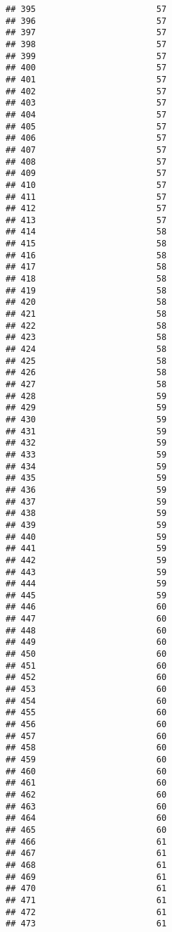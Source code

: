 \documentclass[
]{article}
\begin{document}
\begin{verbatim}
## 395                        57
## 396                        57
## 397                        57
## 398                        57
## 399                        57
## 400                        57
## 401                        57
## 402                        57
## 403                        57
## 404                        57
## 405                        57
## 406                        57
## 407                        57
## 408                        57
## 409                        57
## 410                        57
## 411                        57
## 412                        57
## 413                        57
## 414                        58
## 415                        58
## 416                        58
## 417                        58
## 418                        58
## 419                        58
## 420                        58
## 421                        58
## 422                        58
## 423                        58
## 424                        58
## 425                        58
## 426                        58
## 427                        58
## 428                        59
## 429                        59
## 430                        59
## 431                        59
## 432                        59
## 433                        59
## 434                        59
## 435                        59
## 436                        59
## 437                        59
## 438                        59
## 439                        59
## 440                        59
## 441                        59
## 442                        59
## 443                        59
## 444                        59
## 445                        59
## 446                        60
## 447                        60
## 448                        60
## 449                        60
## 450                        60
## 451                        60
## 452                        60
## 453                        60
## 454                        60
## 455                        60
## 456                        60
## 457                        60
## 458                        60
## 459                        60
## 460                        60
## 461                        60
## 462                        60
## 463                        60
## 464                        60
## 465                        60
## 466                        61
## 467                        61
## 468                        61
## 469                        61
## 470                        61
## 471                        61
## 472                        61
## 473                        61

\end{verbatim}
\end{document}
